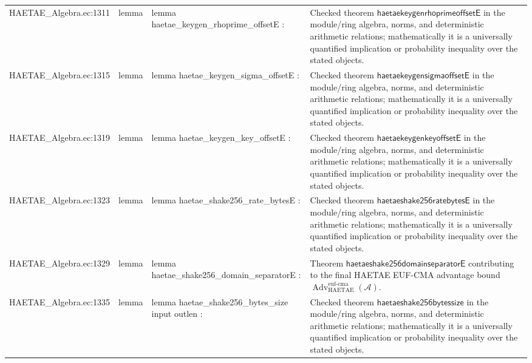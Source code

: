 \documentclass[10pt]{article}
\newcommand{\Adv}{\operatorname{Adv}}
\begin{document}
\begin{longtable}{L{0.11\textwidth}L{0.055\textwidth}L{0.385\textwidth}L{0.41\textwidth}}
HAETAE\_\allowbreak{}Algebra.\allowbreak{}ec:\allowbreak{}1311 & lemma & {\ttfamily\scriptsize lemma haetae\_\allowbreak{}keygen\_\allowbreak{}rhoprime\_\allowbreak{}offsetE :} & Checked theorem $\mathsf{haetaekeygenrhoprimeoffsetE}$ in the module/ring algebra, norms, and deterministic arithmetic relations; mathematically it is a universally quantified implication or probability inequality over the stated objects. \\
HAETAE\_\allowbreak{}Algebra.\allowbreak{}ec:\allowbreak{}1315 & lemma & {\ttfamily\scriptsize lemma haetae\_\allowbreak{}keygen\_\allowbreak{}sigma\_\allowbreak{}offsetE :} & Checked theorem $\mathsf{haetaekeygensigmaoffsetE}$ in the module/ring algebra, norms, and deterministic arithmetic relations; mathematically it is a universally quantified implication or probability inequality over the stated objects. \\
HAETAE\_\allowbreak{}Algebra.\allowbreak{}ec:\allowbreak{}1319 & lemma & {\ttfamily\scriptsize lemma haetae\_\allowbreak{}keygen\_\allowbreak{}key\_\allowbreak{}offsetE :} & Checked theorem $\mathsf{haetaekeygenkeyoffsetE}$ in the module/ring algebra, norms, and deterministic arithmetic relations; mathematically it is a universally quantified implication or probability inequality over the stated objects. \\
HAETAE\_\allowbreak{}Algebra.\allowbreak{}ec:\allowbreak{}1323 & lemma & {\ttfamily\scriptsize lemma haetae\_\allowbreak{}shake256\_\allowbreak{}rate\_\allowbreak{}bytesE :} & Checked theorem $\mathsf{haetaeshake256ratebytesE}$ in the module/ring algebra, norms, and deterministic arithmetic relations; mathematically it is a universally quantified implication or probability inequality over the stated objects. \\
HAETAE\_\allowbreak{}Algebra.\allowbreak{}ec:\allowbreak{}1329 & lemma & {\ttfamily\scriptsize lemma haetae\_\allowbreak{}shake256\_\allowbreak{}domain\_\allowbreak{}separatorE :} & Theorem $\mathsf{haetaeshake256domainseparatorE}$ contributing to the final HAETAE EUF-CMA advantage bound $\Adv_{\mathrm{HAETAE}}^{\mathrm{euf\mbox{-}cma}}(\mathcal A)$. \\
HAETAE\_\allowbreak{}Algebra.\allowbreak{}ec:\allowbreak{}1335 & lemma & {\ttfamily\scriptsize lemma haetae\_\allowbreak{}shake256\_\allowbreak{}bytes\_\allowbreak{}size input outlen :} & Checked theorem $\mathsf{haetaeshake256bytessize}$ in the module/ring algebra, norms, and deterministic arithmetic relations; mathematically it is a universally quantified implication or probability inequality over the stated objects. \\

\end{longtable}
\end{document}
